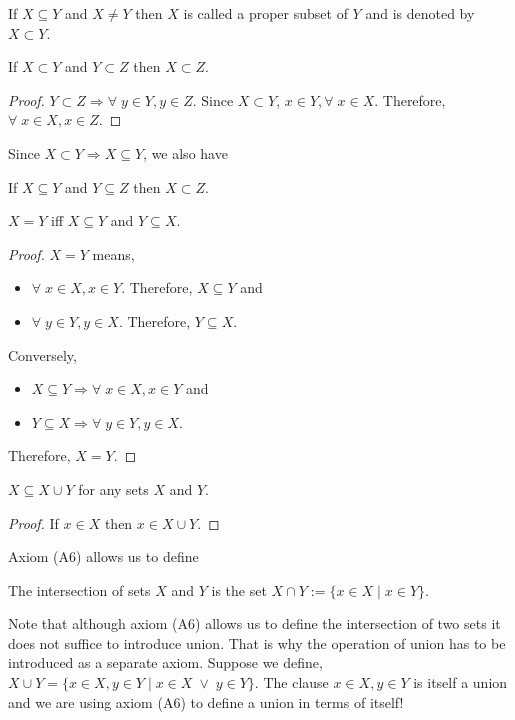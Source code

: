 \begin{defn}\label{c2s1d2}
If $X \subseteq Y$ and $X \ne Y$ then $X$ is called a proper subset of 
$Y$ and is denoted by $X \subset Y$.
\end{defn}

\begin{lem}\label{c2s1l14}
If $X \subset Y$ and $Y \subset Z$ then $X \subset Z$.
\end{lem}
\begin{proof}
$Y \subset Z \Rightarrow \forall\; y \in Y, y \in Z$. Since $X \subset
Y$, $x \in Y, \forall\; x \in X$. Therefore, $\forall\; x \in X, x \in Z$.
\end{proof}

Since $X \subset Y \Rightarrow X \subseteq Y$, we also have
\begin{lem}\label{c2s1l15}
If $X \subseteq Y$ and $Y \subseteq Z$ then $X \subset Z$.
\end{lem}

\begin{lem}\label{c2s1l16}
$X = Y$ iff $X \subseteq Y$ and $Y \subseteq X$.
\end{lem}
\begin{proof}
$X = Y$ means,
\begin{itemize}
\item $\forall\; x \in X, x \in Y$. Therefore, $X \subseteq Y$ and
\item $\forall\; y \in Y, y \in X$. Therefore, $Y \subseteq X$.
\end{itemize}

Conversely,
\begin{itemize}
\item $X \subseteq Y \Rightarrow \forall\; x \in X, x \in Y$ and
\item $Y \subseteq X \Rightarrow \forall\; y \in Y, y \in X$.
\end{itemize}
Therefore, $X = Y$.
\end{proof}

\begin{lem}\label{c2s1l17}
$X \subseteq X \cup Y$ for any sets $X$ and $Y$.
\end{lem}
\begin{proof}
If $x \in X$ then $x \in X \cup Y$.
\end{proof}

Axiom (A6) allows us to define
\begin{defn}\label{c2s1d3}
The intersection of sets $X$ and $Y$ is the set $X \cap Y := \{x \in X
\;|\; x \in Y\}$.
\end{defn}
Note that although axiom (A6) allows us to define the intersection of two
sets it does not suffice to introduce union. That is why the operation of 
union has to be introduced as a separate axiom. Suppose we define, $X \cup
Y = \{x \in X, y \in Y \;|\; x \in X \;\lor\; y \in Y\}$. The clause $x \in
X, y \in Y$ is itself a union and we are using axiom (A6) to define a union
in terms of itself!

